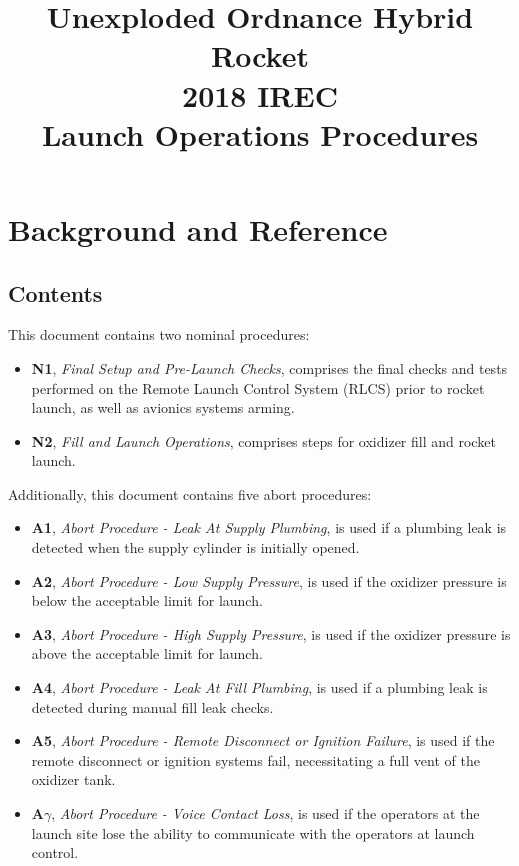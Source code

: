 

\title{
\Huge Unexploded Ordnance Hybrid Rocket\\
2018 IREC\\
\vspace{1cm}
\Large Launch Operations Procedures}





\section{Background and Reference}

\subsection{Contents}
This document contains two nominal procedures:
\begin{itemize}
    \item \textbf{N1}, \textit{Final Setup and Pre-Launch Checks}, comprises the final checks and tests performed on the Remote Launch Control System (RLCS) prior to rocket launch, as well as avionics systems arming.
    \item \textbf{N2}, \textit{Fill and Launch Operations}, comprises steps for oxidizer fill and rocket launch.
\end{itemize}
Additionally, this document contains five abort procedures:
\begin{itemize}
    \item \textbf{A1}, \textit{Abort Procedure - Leak At Supply Plumbing}, is used if a plumbing leak is detected when the supply cylinder is initially opened.
    \item \textbf{A2}, \textit{Abort Procedure - Low Supply Pressure}, is used if the oxidizer pressure is below the acceptable limit for launch.
    \item \textbf{A3}, \textit{Abort Procedure - High Supply Pressure}, is used if the oxidizer pressure is above the acceptable limit for launch.
    \item \textbf{A4}, \textit{Abort Procedure - Leak At Fill Plumbing}, is used if a plumbing leak is detected during manual fill leak checks.
    \item \textbf{A5}, \textit{Abort Procedure - Remote Disconnect or Ignition Failure}, is used if the remote disconnect or ignition systems fail, necessitating a full vent of the oxidizer tank.
    \item \textbf{A\LARGE$\gamma$}, \textit{Abort Procedure - Voice Contact Loss}, is used if the operators at the launch site lose the ability to communicate with the operators at launch control.
\end{itemize}

